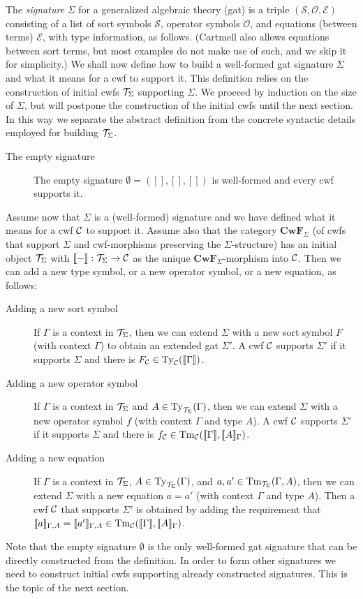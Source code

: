 \documentclass{lmcs}
\def\Sort{\mathcal{S}}
\def\Op{\mathcal{O}}
\def\Eq{\mathcal{E}}
\def\Cwf{\mathbf{CwF}}
\begin{document}
The {\em signature} $\Sigma$ for a generalized algebraic theory (gat) is a triple $(\Sort,\Op,\Eq)$ consisting of a list of sort symbols $\Sort$, operator symbols $\Op$, and equations (between terms) $\Eq$, with type information, as follows. (Cartmell also allows equations between sort terms, but most examples do not make use of such, and we skip it for simplicity.) We shall now define how to build a well-formed gat signature $\Sigma$ and what it means for a cwf to support it. This definition relies on the construction of initial cwfs ${\mathcal T}_\Sigma$ supporting $\Sigma$. We proceed by induction on the size of $\Sigma$, but will postpone the construction of the initial cwfs until the next section. In this way we separate the abstract definition from the concrete syntactic details employed for building ${\mathcal T}_\Sigma$.
\begin{description}
\item[The empty signature] The empty signature $\emptyset = ([],[],[])$ is well-formed and every cwf supports it. 
\end{description}
Assume now that $\Sigma$ is a (well-formed) signature and we have defined what it means for a cwf ${\mathcal C}$ to support it. Assume also that the category $\Cwf_\Sigma$ (of cwfs that support $\Sigma$ and cwf-morphisms preserving the $\Sigma$-structure) has an initial object ${\mathcal T}_\Sigma$ with $\llbracket - \rrbracket : {\mathcal T}_\Sigma \to {\mathcal C}$ as the unique $\Cwf_\Sigma$-morphism into ${\mathcal C}$. Then we can add a new type symbol, or a new operator symbol, or a new equation, as follows:
\begin{description}
\item[Adding a new sort symbol] 
If $\Gamma$ is a context in ${\mathcal T}_\Sigma$, then we can extend $\Sigma$ with a new sort symbol $F$ (with context $\Gamma$) to obtain an extended gat $\Sigma'$. A cwf ${\mathcal C}$ supports $\Sigma'$ if it supports $\Sigma$ and there is $F_{\mathcal C} \in \mathrm{Ty}_{\mathcal C}(\llbracket \Gamma \rrbracket)$.
\item[Adding a new operator symbol] 
If $\Gamma$ is a context in ${\mathcal T}_\Sigma$ and $A \in \mathrm{Ty}_{{\mathcal T}_\Sigma}(\Gamma)$, then we can extend $\Sigma$ with a new operator symbol $f$ (with context $\Gamma$ and type $A$). A cwf ${\mathcal C}$ supports $\Sigma'$ if it supports $\Sigma$ and there is $f_{\mathcal C} \in\mathrm{Tm}_{\mathcal C}(\llbracket \Gamma \rrbracket,\llbracket A \rrbracket_{\Gamma})$.
\item[Adding a new equation] 
If $\Gamma$ is a context in ${\mathcal T}_\Sigma$, $A \in \mathrm{Ty}_{{\mathcal T}_\Sigma}(\Gamma)$, and $a, a' \in \mathrm{Tm}_{{\mathcal T}_\Sigma}(\Gamma,A)$, then we can extend $\Sigma$ with a new equation $a = a'$ (with context $\Gamma$ and type $A$). Then a cwf ${\mathcal C}$ that supports $\Sigma'$ is obtained by adding the requirement that $\llbracket a \rrbracket_{\Gamma,A}= \llbracket a' \rrbracket_{\Gamma,A} \in \mathrm{Tm}_{\mathcal C}(\llbracket \Gamma \rrbracket,\llbracket A \rrbracket_\Gamma)$.
\end{description}
Note that the empty signature $\emptyset$ is the only well-formed gat signature that can be directly constructed from the definition. In order to form other signatures we need to construct initial cwfs supporting already constructed signatures. This is the topic of the next section.
\end{document}
